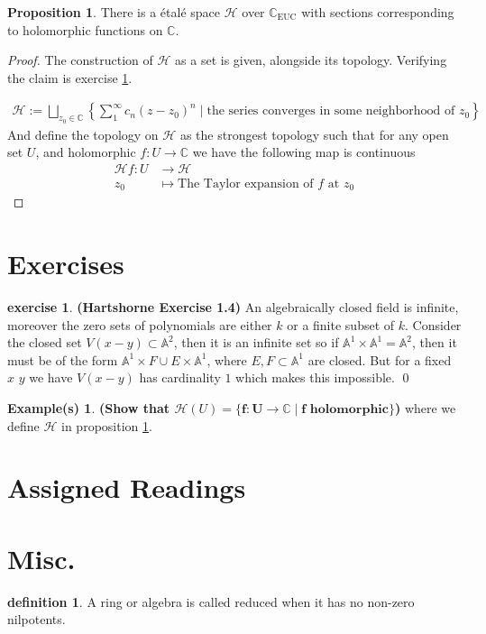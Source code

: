 \documentclass[10.5pt]{article}
\theoremstyle{definition}
\newtheorem{proposition}{Proposition}
\newtheorem{exe}{exercise}
\newtheorem{definition}{definition}
\newtheorem*{example}{Example(s)}
\newcommand{\set}[1]{\{#1\}}
\newcommand{\tor}{\text{ or }}
\begin{document}
    \begin{proposition}\label{Holomorphic as sections}
            There is a \'etal\'e space \(\mathcal{H}\) over \(\mathbb{C}_\text{EUC}\) with sections corresponding to holomorphic functions on \(\mathbb{C}\).
    \end{proposition}
    \begin{proof}
        The construction of \(\mathcal{H}\) as a set is given, alongside its topology. Verifying the claim is exercise \ref{Holomorphic as sections exe}.
        
        \begin{align*}
            \mathcal{H} := \bigsqcup_{z_0 \in \mathbb{C}}\left\{\sum_1^\infty c_n(z-z_0)^n \mid \text{the series converges in some neighborhood of }z_0\right\}
        \end{align*}
        And define the topology on \(\mathcal{H}\) as the strongest topology such that for any open set \(U\), and holomorphic \(f: U \to \mathbb{C}\) we have the following map is continuous
        \begin{align*}
            \mathcal{H}f: U &\to \mathcal{H} \\
            z_0 &\mapsto \text{The Taylor expansion of }f \text{ at }z_0
        \end{align*}
    \end{proof}



    \section{Exercises}
    \begin{exe}\label{HS1.4}\textbf{(Hartshorne Exercise 1.4)}
        An algebraically closed field is infinite, moreover the zero sets of polynomials are either \(k\) or a finite subset of \(k\). Consider the closed set \(V(x-y) \subset \mathbb{A}^2\), then it is an infinite set so if \(\mathbb{A}^1\times \mathbb{A}^1 = \mathbb{A}^2\), then it must be of the form \(\mathbb{A}^1 \times F \cup E \times \mathbb{A}^1\), where \(E,F \subset \mathbb{A}^1\) are closed. But for a fixed \(x\) \tor \(y\) we have \(V(x-y)\) has cardinality \(1\) which makes this impossible. \qed
    \end{exe}
    \begin{example}\label{Holomorphic as sections exe}
        \textbf{(Show that \(\mathcal{H}(U) = \mathbf{\set{f: U \to \mathbb{C} \mid f \text{ holomorphic}}}\))} where we define \(\mathcal{H}\) in proposition \ref{Holomorphic as sections}.
    \end{example}
    \appendix
    
    \section{Assigned Readings}

    \section{Misc.}
    \begin{definition}
        A ring or algebra is called reduced when it has no non-zero nilpotents.
    \end{definition}
\end{document}
